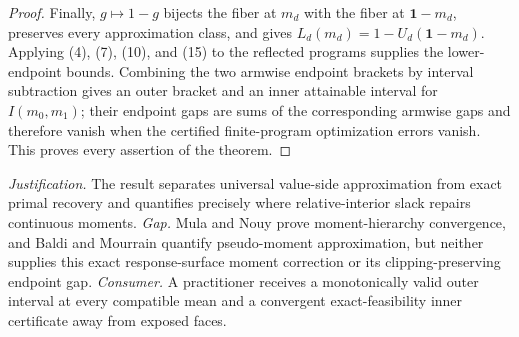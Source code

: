 \documentclass{article}
\begin{document}
\begin{proof}
Finally, \(g\mapsto1-g\) bijects the fiber at \(m_d\) with the fiber at
\(\mathbf1-m_d\), preserves every approximation class, and gives
\(L_d(m_d)=1-U_d(\mathbf1-m_d)\).  Applying (4), (7), (10), and (15) to the
reflected programs supplies the lower-endpoint bounds.  Combining the two
armwise endpoint brackets by interval subtraction gives an outer bracket and
an inner attainable interval for \(I(m_0,m_1)\); their endpoint gaps are sums
of the corresponding armwise gaps and therefore vanish when the certified
finite-program optimization errors vanish.  This proves every assertion of the
theorem.
\end{proof}
\par\smallskip\noindent \textit{Justification.} The result separates universal value-side approximation from exact primal recovery and quantifies precisely where relative-interior slack repairs continuous moments. \textit{Gap.} Mula and Nouy prove moment-hierarchy convergence, and Baldi and Mourrain quantify pseudo-moment approximation, but neither supplies this exact response-surface moment correction or its clipping-preserving endpoint gap. \textit{Consumer.} A practitioner receives a monotonically valid outer interval at every compatible mean and a convergent exact-feasibility inner certificate away from exposed faces.
\end{document}
